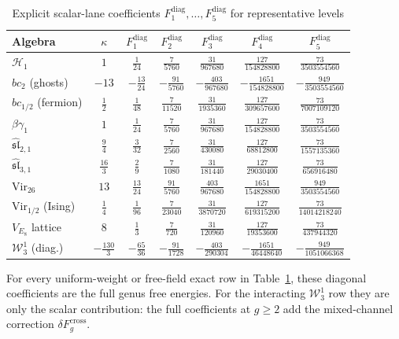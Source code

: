 \begin{table}[ht]
\centering
\caption{Explicit scalar-lane coefficients $F^{\mathrm{diag}}_1,
\ldots, F^{\mathrm{diag}}_5$ for representative levels}
\label{tab:genus-expansion-values}
\renewcommand{\arraystretch}{1.5}
{\footnotesize
\begin{tabular}{|l|c|c|c|c|c|c|}
\hline
\textbf{Algebra} & $\kappa$ & $F^{\mathrm{diag}}_1$
& $F^{\mathrm{diag}}_2$ & $F^{\mathrm{diag}}_3$
& $F^{\mathrm{diag}}_4$ & $F^{\mathrm{diag}}_5$ \\
\hline
$\mathcal{H}_1$
 & $1$ & $\frac{1}{24}$ & $\frac{7}{5760}$ & $\frac{31}{967680}$
 & $\frac{127}{154828800}$ & $\frac{73}{3503554560}$ \\
\hline
$bc_2$ (ghosts)
 & $-13$ & $-\frac{13}{24}$ & $-\frac{91}{5760}$ & $-\frac{403}{967680}$
 & $-\frac{1651}{154828800}$ & $-\frac{949}{3503554560}$ \\[2pt]
\hline
$bc_{1/2}$ (fermion)
 & $\frac{1}{2}$ & $\frac{1}{48}$ & $\frac{7}{11520}$ & $\frac{31}{1935360}$
 & $\frac{127}{309657600}$ & $\frac{73}{7007109120}$ \\[4pt]
\hline
$\beta\gamma_1$
 & $1$ & $\frac{1}{24}$ & $\frac{7}{5760}$ & $\frac{31}{967680}$
 & $\frac{127}{154828800}$ & $\frac{73}{3503554560}$ \\
\hline
$\widehat{\mathfrak{sl}}_{2,1}$
 & $\frac{9}{4}$ & $\frac{3}{32}$ & $\frac{7}{2560}$ & $\frac{31}{430080}$
 & $\frac{127}{68812800}$ & $\frac{73}{1557135360}$ \\[4pt]
\hline
$\widehat{\mathfrak{sl}}_{3,1}$
 & $\frac{16}{3}$ & $\frac{2}{9}$ & $\frac{7}{1080}$ & $\frac{31}{181440}$
 & $\frac{127}{29030400}$ & $\frac{73}{656916480}$ \\[4pt]
\hline
$\mathrm{Vir}_{26}$
 & $13$ & $\frac{13}{24}$ & $\frac{91}{5760}$ & $\frac{403}{967680}$
 & $\frac{1651}{154828800}$ & $\frac{949}{3503554560}$ \\
\hline
$\mathrm{Vir}_{1/2}$ (Ising)
 & $\frac{1}{4}$ & $\frac{1}{96}$ & $\frac{7}{23040}$ & $\frac{31}{3870720}$
 & $\frac{127}{619315200}$ & $\frac{73}{14014218240}$ \\[4pt]
\hline
$V_{E_8}$ lattice
 & $8$ & $\frac{1}{3}$ & $\frac{7}{720}$ & $\frac{31}{120960}$
 & $\frac{127}{19353600}$ & $\frac{73}{437944320}$ \\
\hline
$\mathcal{W}_3^1$ (diag.)
 & $-\frac{130}{3}$ & $-\frac{65}{36}$ & $-\frac{91}{1728}$ & $-\frac{403}{290304}$
 & $-\frac{1651}{46448640}$ & $-\frac{949}{1051066368}$ \\[4pt]
\hline
\end{tabular}
}
\end{table}
\noindent
For every uniform-weight or free-field exact row in
Table~\ref{tab:genus-expansion-values}, these diagonal coefficients
are the full genus free energies. For the interacting
$\mathcal{W}_3^1$ row they are only the scalar contribution:
the full coefficients at $g \geq 2$ add the mixed-channel correction
$\delta F_g^{\mathrm{cross}}$.

